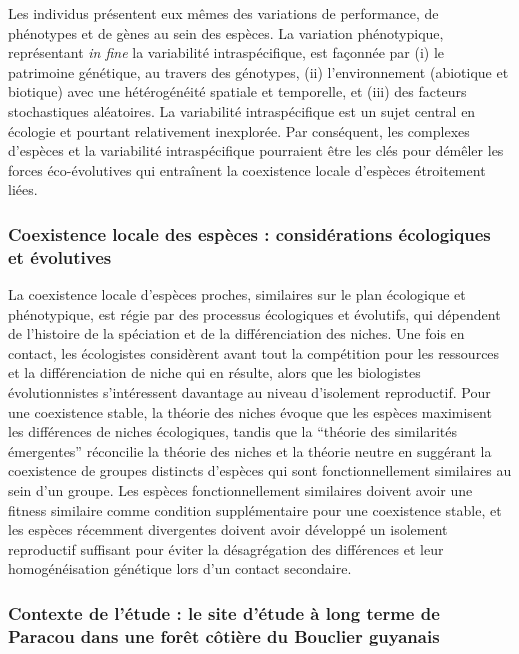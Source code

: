 \documentclass[12pt,twoside,a4paper, a]{article}
\begin{document}
Les individus présentent eux mêmes des variations de performance, de phénotypes et de gènes au sein des espèces. La variation phénotypique, représentant \emph{in fine} la variabilité intraspécifique, est façonnée par (i) le patrimoine génétique, au travers des génotypes, (ii) l'environnement (abiotique et biotique) avec une hétérogénéité spatiale et temporelle, et (iii) des facteurs stochastiques aléatoires. La variabilité intraspécifique est un sujet central en écologie et pourtant relativement inexplorée. Par conséquent, les complexes d'espèces et la variabilité intraspécifique pourraient être les clés pour démêler les forces éco-évolutives qui entraînent la coexistence locale d'espèces étroitement liées.

\hypertarget{coexistence-locale-des-espuxe8ces-considuxe9rations-uxe9cologiques-et-uxe9volutives}{%
\subsubsection{Coexistence locale des espèces : considérations écologiques et évolutives}\label{coexistence-locale-des-espuxe8ces-considuxe9rations-uxe9cologiques-et-uxe9volutives}}

La coexistence locale d'espèces proches, similaires sur le plan écologique et phénotypique, est régie par des processus écologiques et évolutifs, qui dépendent de l'histoire de la spéciation et de la différenciation des niches. Une fois en contact, les écologistes considèrent avant tout la compétition pour les ressources et la différenciation de niche qui en résulte, alors que les biologistes évolutionnistes s'intéressent davantage au niveau d'isolement reproductif. Pour une coexistence stable, la théorie des niches évoque que les espèces maximisent les différences de niches écologiques, tandis que la ``théorie des similarités émergentes'' réconcilie la théorie des niches et la théorie neutre en suggérant la coexistence de groupes distincts d'espèces qui sont fonctionnellement similaires au sein d'un groupe. Les espèces fonctionnellement similaires doivent avoir une fitness similaire comme condition supplémentaire pour une coexistence stable, et les espèces récemment divergentes doivent avoir développé un isolement reproductif suffisant pour éviter la désagrégation des différences et leur homogénéisation génétique lors d'un contact secondaire.

\hypertarget{contexte-de-luxe9tude-le-site-duxe9tude-uxe0-long-terme-de-paracou-dans-une-foruxeat-cuxf4tiuxe8re-du-bouclier-guyanais}{%
\subsubsection{Contexte de l'étude : le site d'étude à long terme de Paracou dans une forêt côtière du Bouclier guyanais}\label{contexte-de-luxe9tude-le-site-duxe9tude-uxe0-long-terme-de-paracou-dans-une-foruxeat-cuxf4tiuxe8re-du-bouclier-guyanais}}
\end{document}
